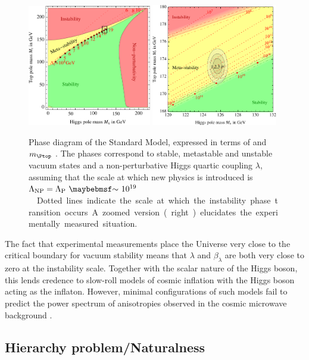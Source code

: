 \begin{figure}[t]
	\includegraphics[width=0.48\textwidth]{tex/conclusions/vacuum_stability}
	\hfill
	\includegraphics[width=0.49\textwidth]{tex/conclusions/vacuum_stability_zoom}
	\caption{Phase diagram of the Standard Model, expressed in terms of \mH and 
	$m_{\Ptop}$ \cite{Degrassi:vacuum}. The phases correspond to stable, metastable and 
	unstable vacuum states and a non-perturbative Higgs quartic coupling $\lambda$, 
	assuming that the scale at which new physics is introduced is 
	\unit{$\Lambda_{\text{NP}} = \Lambda_{\text{P}}~\about~10^{19}$}{\GeV}. Dotted lines 
	indicate the scale at which the instability phase transition occurs. A zoomed version 
	(right) elucidates the experimentally measured situation.}
	\label{fig:concl:vacuum_stability}
\end{figure}

The fact that experimental measurements place the Universe very close to the critical 
boundary for vacuum stability means that $\lambda$ and $\beta_{\lambda}$ are both very 
close to zero at the instability scale. Together with the scalar nature of the Higgs 
boson, this lends credence to slow-roll models of cosmic inflation with the Higgs boson 
acting as the inflaton. However, minimal configurations of such models fail to predict the 
power spectrum of anisotropies observed in the cosmic microwave background 
\cite{Isidori:2007}.



\subsection{Hierarchy problem/Naturalness}
\label{sec:implications:naturalness}


